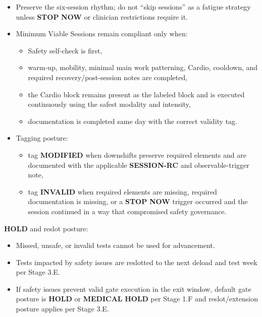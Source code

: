 \documentclass[10pt]{article}
\begin{document}
\begin{itemize}
\item Preserve the six-session rhythm; do not “skip sessions” as a fatigue strategy unless \textbf{STOP} \textbf{NOW} or clinician restrictions require it.
\item Minimum Viable Sessions remain compliant only when:
  \begin{itemize}
  \item Safety self-check is first,
  \item warm-up, mobility, minimal main work patterning, Cardio, cooldown, and required recovery/post-session notes are completed,
  \item the Cardio block remains present as the labeled block and is executed continuously using the safest modality and intensity,
  \item documentation is completed same day with the correct validity tag.
  \end{itemize}
\item Tagging posture:
  \begin{itemize}
  \item tag \textbf{MODIFIED} when downshifts preserve required elements and are documented with the applicable \textbf{SESSION-RC} and observable-trigger note,
  \item tag \textbf{INVALID} when required elements are missing, required documentation is missing, or a \textbf{STOP} \textbf{NOW} trigger occurred and the session continued in a way that compromised safety governance.
  \end{itemize}
\end{itemize}

\textbf{HOLD} and reslot posture:

\begin{itemize}
\item Missed, unsafe, or invalid tests cannot be used for advancement.
\item Tests impacted by safety issues are reslotted to the next deload and test week per Stage 3.E.
\item If safety issues prevent valid gate execution in the exit window, default gate posture is \textbf{HOLD} or \textbf{MEDICAL} \textbf{HOLD} per Stage 1.F and reslot/extension posture applies per Stage 3.E.
\end{itemize}
\end{document}
